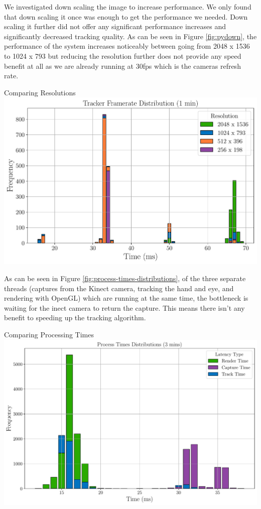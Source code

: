 We investigated down scaling the image to increase performance. We only found that down scaling it once was enough to get the performance we needed. Down scaling it further did not offer any significant performance increases and significantly decreased tracking quality. As can be seen in Figure \ref{fig:pydown}, the performance of the system increases noticeably between going from 2048 x 1536 to 1024 x 793 but reducing the resolution further does not provide any speed benefit at all as we are already running at 30fps which is the cameras refresh rate.

\begin{figureBox}[label={fig:pydown}, width=1.0\linewidth]{Comparing Resolutions}
	\includegraphics[width = 1.0\linewidth]{./evaluation/figures/pydown.pdf}
\end{figureBox}

As can be seen in Figure \ref{fig:process-times-distributions}, of the three separate threads (captures from the Kinect camera, tracking the hand and eye, and rendering with OpenGL) which are running at the same time, the bottleneck is waiting for the inect camera to return the capture. This means there isn't any benefit to speeding up the tracking algorithm.

\begin{figureBox}[label={fig:process-times-distributions}, width=1.0\linewidth]{Comparing Processing Times}
	\includegraphics[width = 1.0\linewidth]{./evaluation/figures/process-times-distributions.pdf}
\end{figureBox}

